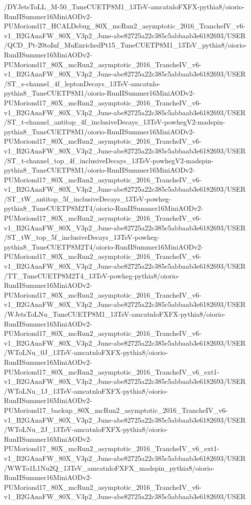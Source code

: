 /DYJetsToLL_M-50_TuneCUETP8M1_13TeV-amcatnloFXFX-pythia8/oiorio-RunIISummer16MiniAODv2-PUMoriond17_HCALDebug_80X_mcRun2_asymptotic_2016_TrancheIV_v6-v1_B2GAnaFW_80X_V3p2_June-abe82725a22c385c5abbaab3e6182693/USER
/QCD_Pt-20toInf_MuEnrichedPt15_TuneCUETP8M1_13TeV_pythia8/oiorio-RunIISummer16MiniAODv2-PUMoriond17_80X_mcRun2_asymptotic_2016_TrancheIV_v6-v1_B2GAnaFW_80X_V3p2_June-abe82725a22c385c5abbaab3e6182693/USER
/ST_s-channel_4f_leptonDecays_13TeV-amcatnlo-pythia8_TuneCUETP8M1/oiorio-RunIISummer16MiniAODv2-PUMoriond17_80X_mcRun2_asymptotic_2016_TrancheIV_v6-v1_B2GAnaFW_80X_V3p2_June-abe82725a22c385c5abbaab3e6182693/USER
/ST_t-channel_antitop_4f_inclusiveDecays_13TeV-powhegV2-madspin-pythia8_TuneCUETP8M1/oiorio-RunIISummer16MiniAODv2-PUMoriond17_80X_mcRun2_asymptotic_2016_TrancheIV_v6-v1_B2GAnaFW_80X_V3p2_June-abe82725a22c385c5abbaab3e6182693/USER
/ST_t-channel_top_4f_inclusiveDecays_13TeV-powhegV2-madspin-pythia8_TuneCUETP8M1/oiorio-RunIISummer16MiniAODv2-PUMoriond17_80X_mcRun2_asymptotic_2016_TrancheIV_v6-v1_B2GAnaFW_80X_V3p2_June-abe82725a22c385c5abbaab3e6182693/USER
/ST_tW_antitop_5f_inclusiveDecays_13TeV-powheg-pythia8_TuneCUETP8M2T4/oiorio-RunIISummer16MiniAODv2-PUMoriond17_80X_mcRun2_asymptotic_2016_TrancheIV_v6-v1_B2GAnaFW_80X_V3p2_June-abe82725a22c385c5abbaab3e6182693/USER
/ST_tW_top_5f_inclusiveDecays_13TeV-powheg-pythia8_TuneCUETP8M2T4/oiorio-RunIISummer16MiniAODv2-PUMoriond17_80X_mcRun2_asymptotic_2016_TrancheIV_v6-v1_B2GAnaFW_80X_V3p2_June-abe82725a22c385c5abbaab3e6182693/USER
/TT_TuneCUETP8M2T4_13TeV-powheg-pythia8/oiorio-RunIISummer16MiniAODv2-PUMoriond17_80X_mcRun2_asymptotic_2016_TrancheIV_v6-v1_B2GAnaFW_80X_V3p2_June-abe82725a22c385c5abbaab3e6182693/USER
/WJetsToLNu_TuneCUETP8M1_13TeV-amcatnloFXFX-pythia8/oiorio-RunIISummer16MiniAODv2-PUMoriond17_80X_mcRun2_asymptotic_2016_TrancheIV_v6-v1_B2GAnaFW_80X_V3p2_June-abe82725a22c385c5abbaab3e6182693/USER
/WToLNu_0J_13TeV-amcatnloFXFX-pythia8/oiorio-RunIISummer16MiniAODv2-PUMoriond17_80X_mcRun2_asymptotic_2016_TrancheIV_v6_ext1-v1_B2GAnaFW_80X_V3p2_June-abe82725a22c385c5abbaab3e6182693/USER
/WToLNu_1J_13TeV-amcatnloFXFX-pythia8/oiorio-RunIISummer16MiniAODv2-PUMoriond17_backup_80X_mcRun2_asymptotic_2016_TrancheIV_v6-v1_B2GAnaFW_80X_V3p2_June-abe82725a22c385c5abbaab3e6182693/USER
/WToLNu_2J_13TeV-amcatnloFXFX-pythia8/oiorio-RunIISummer16MiniAODv2-PUMoriond17_80X_mcRun2_asymptotic_2016_TrancheIV_v6_ext1-v1_B2GAnaFW_80X_V3p2_June-abe82725a22c385c5abbaab3e6182693/USER
/WWTo1L1Nu2Q_13TeV_amcatnloFXFX_madspin_pythia8/oiorio-RunIISummer16MiniAODv2-PUMoriond17_80X_mcRun2_asymptotic_2016_TrancheIV_v6-v1_B2GAnaFW_80X_V3p2_June-abe82725a22c385c5abbaab3e6182693/USER
